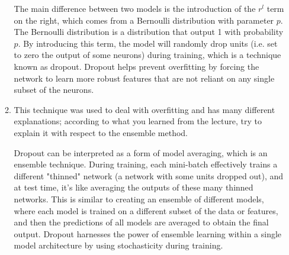\documentclass[twocolumn]{extarticle}
\begin{document}
\begin{enumerate}
\begin{enumerate}[label=\alph*.]
		The main difference between two models is the introduction of the $r^l$ term on the right, which comes from a Bernoulli distribution with parameter $p$. The Bernoulli distribution is a distribution that output 1 with probability $p$. By introducing this term, the model will randomly drop units (i.e. set to zero the output of some neurons) during training, which is a technique known as dropout. Dropout helps prevent overfitting by forcing the network to learn more robust features that are not reliant on any single subset of the neurons.
		
		\item This technique was used to deal with overfitting and has many different explanations; according to what you learned from the lecture, try to explain it with respect to the ensemble method.
		
		Dropout can be interpreted as a form of model averaging, which is an ensemble technique. During training, each mini-batch effectively trains a different "thinned" network (a network with some units dropped out), and at test time, it's like averaging the outputs of these many thinned networks. This is similar to creating an ensemble of different models, where each model is trained on a different subset of the data or features, and then the predictions of all models are averaged to obtain the final output. Dropout harnesses the power of ensemble learning within a single model architecture by using stochasticity during training.
	\end{enumerate}
\end{enumerate}
\end{document}
